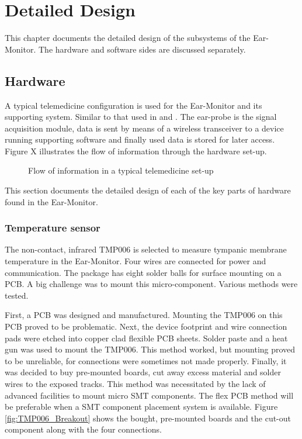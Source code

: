 \chapter{Detailed Design}
\label{chp:DetailedDesign}
This chapter documents the detailed design of the subsystems of the Ear-Monitor. The hardware and software sides are discussed separately. 

\section{Hardware}

A typical telemedicine configuration is used for the Ear-Monitor and its supporting system. Similar to that used in \cite{wang2010wearable} and \cite{prawiro2016integrated}. The ear-probe is the signal acquisition module, data is sent by means of a wireless transceiver to a device running supporting software and finally used data is stored for later access. Figure X illustrates the flow of information through the hardware set-up.

\begin{figure}[h]
\centering
\graphicspath{{figs/}}

\caption{Flow of information in a typical telemedicine set-up}
\label{fig:HardwareFlowchart}
\end{figure}

This section documents the detailed design of each of the key parts of hardware found in the Ear-Monitor.

\subsection{Temperature sensor}
The non-contact, infrared TMP006 is selected to measure tympanic membrane temperature in the Ear-Monitor. Four wires are connected for power and communication. The package has eight solder balls for surface mounting on a PCB. A big challenge was to mount this micro-component. Various methods were tested. 

\medskip

First, a PCB was designed and manufactured. Mounting the TMP006 on this PCB proved to be problematic. Next, the device footprint and wire connection pads were etched into copper clad flexible PCB sheets. Solder paste and a heat gun was used to mount the TMP006. This method worked, but mounting proved to be unreliable, for connections were sometimes not made properly. Finally, it was decided to buy pre-mounted boards, cut away excess material and solder wires to the exposed tracks. This method was necessitated by the lack of advanced facilities to mount micro SMT components. The flex PCB method will be preferable when a SMT component placement system is available. Figure \ref{fig:TMP006_Breakout} shows the bought, pre-mounted boards and the cut-out component along with the four connections.

